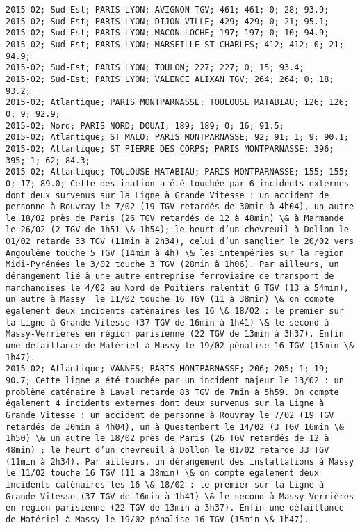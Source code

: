 \documentclass{article}
\begin{document}
\begin{Verbatim}[commandchars=\\\{\}]
2015-02; Sud-Est; PARIS LYON; AVIGNON TGV; 461; 461; 0; 28; 93.9; 
2015-02; Sud-Est; PARIS LYON; DIJON VILLE; 429; 429; 0; 21; 95.1; 
2015-02; Sud-Est; PARIS LYON; MACON LOCHE; 197; 197; 0; 10; 94.9; 
2015-02; Sud-Est; PARIS LYON; MARSEILLE ST CHARLES; 412; 412; 0; 21; 94.9; 
2015-02; Sud-Est; PARIS LYON; TOULON; 227; 227; 0; 15; 93.4; 
2015-02; Sud-Est; PARIS LYON; VALENCE ALIXAN TGV; 264; 264; 0; 18; 93.2; 
2015-02; Atlantique; PARIS MONTPARNASSE; TOULOUSE MATABIAU; 126; 126; 0; 9; 92.9; 
2015-02; Nord; PARIS NORD; DOUAI; 189; 189; 0; 16; 91.5; 
2015-02; Atlantique; ST MALO; PARIS MONTPARNASSE; 92; 91; 1; 9; 90.1; 
2015-02; Atlantique; ST PIERRE DES CORPS; PARIS MONTPARNASSE; 396; 395; 1; 62; 84.3; 
2015-02; Atlantique; TOULOUSE MATABIAU; PARIS MONTPARNASSE; 155; 155; 0; 17; 89.0; Cette destination a été touchée par 6 incidents externes dont deux survenus sur la Ligne à Grande Vitesse : un accident de personne à Rouvray le 7/02 (19 TGV retardés de 30min à 4h04), un autre le 18/02 près de Paris (26 TGV retardés de 12 à 48min) \& à Marmande le 26/02 (2 TGV de 1h51 \& 1h54); le heurt d’un chevreuil à Dollon le 01/02 retarde 33 TGV (11min à 2h34), celui d’un sanglier le 20/02 vers Angoulême touche 5 TGV (14min à 4h) \& les intempéries sur la région Midi-Pyrénées le 3/02 touche 3 TGV (28min à 1h06). Par ailleurs, un dérangement lié à une autre entreprise ferroviaire de transport de marchandises le 4/02 au Nord de Poitiers ralentit 6 TGV (13 à 54min), un autre à Massy  le 11/02 touche 16 TGV (11 à 38min) \& on compte également deux incidents caténaires les 16 \& 18/02 : le premier sur la Ligne à Grande Vitesse (37 TGV de 16min à 1h41) \& le second à Massy-Verrières en région parisienne (22 TGV de 13min à 3h37). Enfin une défaillance de Matériel à Massy le 19/02 pénalise 16 TGV (15min \& 1h47).
2015-02; Atlantique; VANNES; PARIS MONTPARNASSE; 206; 205; 1; 19; 90.7; Cette ligne a été touchée par un incident majeur le 13/02 : un problème caténaire à Laval retarde 83 TGV de 7min à 5h59. On compte également 4 incidents externes dont deux survenus sur la Ligne à Grande Vitesse : un accident de personne à Rouvray le 7/02 (19 TGV retardés de 30min à 4h04), un à Questembert le 14/02 (3 TGV 16min \& 1h50) \& un autre le 18/02 près de Paris (26 TGV retardés de 12 à 48min) ; le heurt d’un chevreuil à Dollon le 01/02 retarde 33 TGV (11min à 2h34). Par ailleurs, un dérangement des installations à Massy  le 11/02 touche 16 TGV (11 à 38min) \& on compte également deux incidents caténaires les 16 \& 18/02 : le premier sur la Ligne à Grande Vitesse (37 TGV de 16min à 1h41) \& le second à Massy-Verrières en région parisienne (22 TGV de 13min à 3h37). Enfin une défaillance de Matériel à Massy le 19/02 pénalise 16 TGV (15min \& 1h47).

\end{Verbatim}
\end{document}
